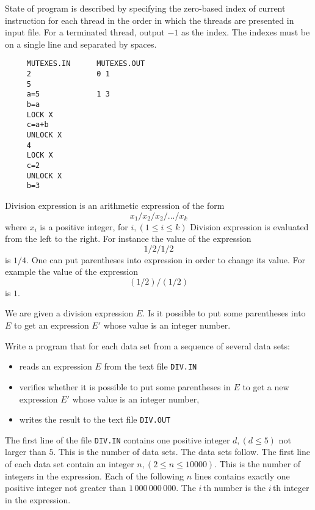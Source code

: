 State of program is described by specifying the zero-based index of current instruction
for each thread in the order in which the threads are presented in input file. For a
terminated thread, output $-1$ as the index. The indexes must be on a single line and
separated by spaces.


\begin{verbatim}
     MUTEXES.IN      MUTEXES.OUT
     2               0 1
     5
     a=5             1 3
     b=a
     LOCK X
     c=a+b
     UNLOCK X
     4
     LOCK X
     c=2
     UNLOCK X
     b=3
\end{verbatim}
\newpage

Division expression is an arithmetic expression of the form
$$
    x_1/x_2/x_2/.../x_k
$$
where $x_i$ is a positive integer, for $i,(1\leq i \leq k)$
Division expression is evaluated from the left to the right.
For instance the value of the expression
$$
    1/2/1/2
$$
is $1/4$. One can put parentheses into expression in order to change its
value. For example the value of the expression
$$
    (1/2)/(1/2)
$$
is $1$.

We are given a division expression $E$. Is it possible to put some
parentheses into $E$ to get an expression $E'$ whose value is an integer number.

Write a program that for each data set from a sequence of several data sets:
\begin{itemize}
\item reads an expression $E$ from the text file \verb|DIV.IN|

\item verifies whether it is possible to put some parentheses in $E$ to get a new
expression $E'$ whose value is an integer number,

\item writes the result to the text file \verb|DIV.OUT|
\end{itemize}

The first line of the file \verb|DIV.IN| contains one positive integer $d, (d\leq 5)$
not larger than $5$. This is the number of data sets. The data sets follow. The first
line of each data set contain an integer $n, (2\leq n \leq 10000)$. This is the
number of integers in the expression. Each of the following $n$ lines contains
exactly one positive integer not greater than $1\,000\,000\,000$. The $i\,$th number is
the $i\,$th integer in the expression.

